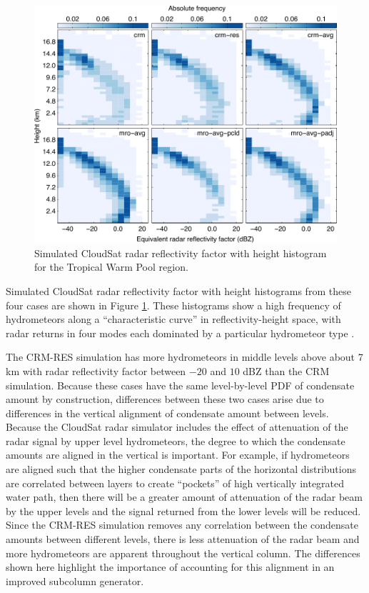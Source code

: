 \documentclass[letter]{article}
\begin{document}
\begin{figure}
\centering
\includegraphics{radar_alt40-dbze.pdf}
\caption{Simulated CloudSat radar reflectivity factor with height histogram for the Tropical Warm Pool region.}
\label{cfadDbze94_figure}
\end{figure}


Simulated CloudSat \citep{stephens_et_al_2002} radar reflectivity factor with height histograms from these four cases are shown in Figure \ref{cfadDbze94_figure}. These histograms show a high frequency of hydrometeors along a “characteristic curve” in reflectivity-height space, with radar returns in four modes each dominated by a particular hydrometeor type \citep[described in detail by][]{marchand_et_al_2009}.

The CRM-RES simulation has more hydrometeors in middle levels above about 7 km with radar reflectivity factor between $-20$ and $10$ dBZ than the CRM simulation. Because these cases have the same level-by-level PDF of condensate amount by construction, differences between these two cases arise due to differences in the vertical alignment of condensate amount between levels. Because the CloudSat radar simulator includes the effect of attenuation of the radar signal by upper level hydrometeors, the degree to which the condensate amounts are aligned in the vertical is important. For example, if hydrometeors are aligned such that the higher condensate parts of the horizontal distributions are correlated between layers to create “pockets” of high vertically integrated water path, then there will be a greater amount of attenuation of the radar beam by the upper levels and the signal returned from the lower levels will be reduced. Since the CRM-RES simulation removes any correlation between the condensate amounts between different levels, there is less attenuation of the radar beam and more hydrometeors are apparent throughout the vertical column. The differences shown here highlight the importance of accounting for this alignment in an improved subcolumn generator. 
\end{document}
